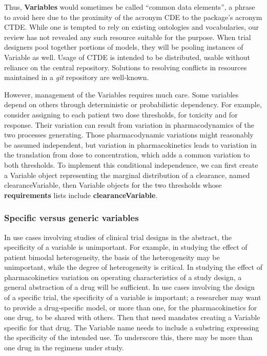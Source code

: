 \documentclass[12pt]{amsart}
\newcommand{\Rcode}[1]{{\textbf{#1}}}
\def\code<#1>{\textbf{#1}}
\begin{document}
Thus, \Rcode{Variables}  would sometimes be called 
``common data elements'',
a phrase to avoid here due to the proximity of the acronym CDE to the package's
acronym CTDE.
While one is tempted to rely on existing ontologies and
vocabularies, our review has not revealed any such resource
suitable for the purpose. 
When trial designers pool together portions of models,
they will be pooling instances of Variable as well.
Usage of CTDE is intended to be distributed,
usable without  reliance on the central repository.
Solutions to resolving conflicts in resources maintained 
in a \textit{git} repository are well-known.

However, management of the Variables requires much care.
Some variables depend on others through deterministic or probabilistic dependency.
For example, consider assigning to each patient two dose thresholds, for toxicity and for response.
Their variation can result from variation in pharmacodynamics of the
two processes generating. Those pharmacodynamic variations might reasonably be assumed
independent, but variation in pharmacokinetics leads to variation in the 
translation from dose to concentration, which adds a common variation to 
both thresholds.
To implement this conditional independence, 
we can first create a Variable object representing 
the marginal distribution of a clearance,
named clearanceVariable,
then  Variable objects for the two thresholds
whose \code<requirements>  lists include
\code<clearanceVariable>. 



\subsubsection{Specific versus generic variables}


In  use cases involving studies of clinical trial designs in the abstract,
the specificity of a variable is unimportant.
For example, in studying the effect of patient bimodal heterogeneity,
the basis of the heterogeneity may be unimportant,
while the degree of heterogeneity is critical.
In studying the effect of pharmacokinetics variation on 
operating characteristics of a study design,
a general  abstraction of a drug will be sufficient.
In use cases involving the design of a specific trial,
the specificity of a variable is important;
a researcher may want to provide a
 drug-specific model,
or more than one,
for the pharmacokinetics for one drug,
to be shared with others.
Then that need mandates creating a Variable specific for that drug.
The Variable name needs to include a substring expressing the specificity 
of the intended use.
To underscore this, there may be more than one drug in the regimens under study.
\end{document}
